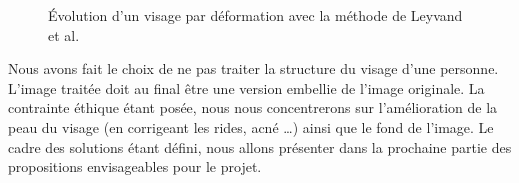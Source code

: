 \documentclass[11pt, french,screen]{report-rd-info}
\begin{document}
\begin{figure}[htp]
 \centering
 \caption{Évolution d’un visage par déformation avec la méthode de Leyvand et al. \cite{Leyvand2008}}
 \label{fig:VisagesData}
\end{figure}

Nous avons fait le choix de ne pas traiter la structure du visage d’une personne. L’image traitée doit au final être une version embellie de l’image originale. La contrainte éthique étant posée,  nous nous concentrerons sur l’amélioration de la peau du visage (en corrigeant les rides, acné \ldots) ainsi que le fond de l’image.
Le cadre des solutions étant défini, nous allons présenter dans la prochaine partie des propositions envisageables pour le projet.
\end{document}
